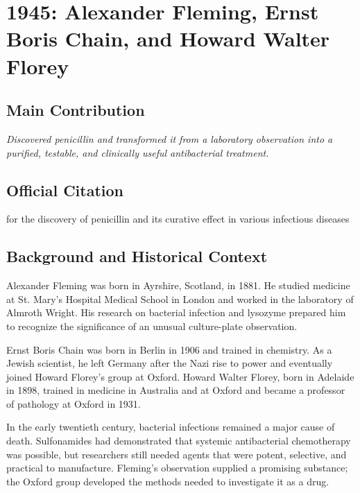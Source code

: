\chapter[1945 --- Fleming, Chain, and Florey]{1945: Alexander Fleming, Ernst Boris Chain, and Howard Walter Florey}
\label{ch:1945_Fleming}

\section*{Main Contribution}

\textit{Discovered penicillin and transformed it from a laboratory observation into a purified, testable, and clinically useful antibacterial treatment.}\cite{nobel-1945,lecture-1945}

\section{Official Citation}

for the discovery of penicillin and its curative effect in various infectious diseases

\section{Background and Historical Context}

Alexander Fleming was born in Ayrshire, Scotland, in 1881. He studied medicine at St. Mary's Hospital Medical School in London and worked in the laboratory of Almroth Wright. His research on bacterial infection and lysozyme prepared him to recognize the significance of an unusual culture-plate observation.

Ernst Boris Chain was born in Berlin in 1906 and trained in chemistry. As a Jewish scientist, he left Germany after the Nazi rise to power and eventually joined Howard Florey's group at Oxford. Howard Walter Florey, born in Adelaide in 1898, trained in medicine in Australia and at Oxford and became a professor of pathology at Oxford in 1931.

In the early twentieth century, bacterial infections remained a major cause of death. Sulfonamides had demonstrated that systemic antibacterial chemotherapy was possible, but researchers still needed agents that were potent, selective, and practical to manufacture. Fleming's observation supplied a promising substance; the Oxford group developed the methods needed to investigate it as a drug.

